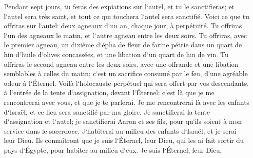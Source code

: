 \verse Pendant sept jours, tu feras des expiations sur l`autel, et tu le sanctifieras; et l`autel sera très saint, et tout ce qui touchera l`autel sera sanctifié. 
\verse Voici ce que tu offriras sur l`autel: deux agneaux d`un an, chaque jour, à perpétuité. 
\verse Tu offriras l`un des agneaux le matin, et l`autre agneau entre les deux soirs. 
\verse Tu offriras, avec le premier agneau, un dixième d`épha de fleur de farine pétrie dans un quart de hin d`huile d`olives concassées, et une libation d`un quart de hin de vin. 
\verse Tu offriras le second agneau entre les deux soirs, avec une offrande et une libation semblables à celles du matin; c`est un sacrifice consumé par le feu, d`une agréable odeur à l`Éternel. 
\verse Voilà l`holocauste perpétuel qui sera offert par vos descendants, à l`entrée de la tente d`assignation, devant l`Éternel: c`est là que je me rencontrerai avec vous, et que je te parlerai. 
\verse Je me rencontrerai là avec les enfants d`Israël, et ce lieu sera sanctifié par ma gloire. 
\verse Je sanctifierai la tente d`assignation et l`autel; je sanctifierai Aaron et ses fils, pour qu`ils soient à mon service dans le sacerdoce. 
\verse J`habiterai au milieu des enfants d`Israël, et je serai leur Dieu. 
\verse Ils connaîtront que je suis l`Éternel, leur Dieu, qui les ai fait sortir du pays d`Égypte, pour habiter au milieu d`eux. Je suis l`Éternel, leur Dieu. 

\chapter{}

